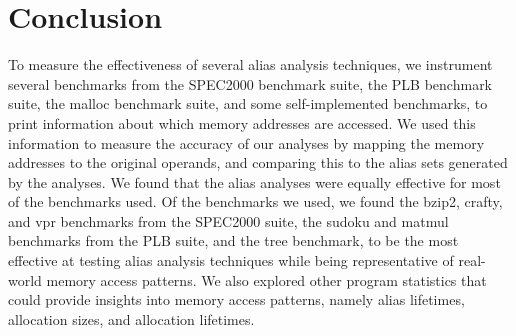 \chapter{Conclusion}

To measure the effectiveness of several alias analysis techniques, we instrument several benchmarks from the SPEC2000 benchmark suite, the PLB benchmark suite, the malloc benchmark suite, and some self-implemented benchmarks, to print information about which memory addresses are accessed. We used this information to measure the accuracy of our analyses by mapping the memory addresses to the original operands, and comparing this to the alias sets generated by the analyses. We found that the alias analyses were equally effective for most of the benchmarks used. Of the benchmarks we used, we found the bzip2, crafty, and vpr benchmarks from the SPEC2000 suite, the sudoku and matmul benchmarks from the PLB suite, and the tree benchmark, to be the most effective at testing alias analysis techniques while being representative of real-world memory access patterns. We also explored other program statistics that could provide insights into memory access patterns, namely alias lifetimes, allocation sizes, and allocation lifetimes.
